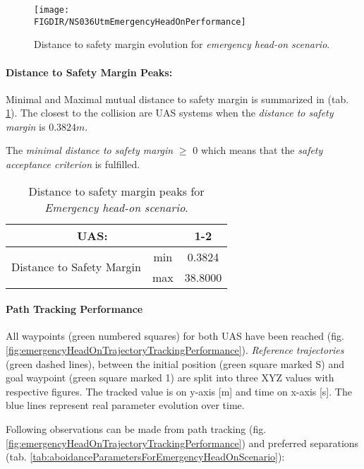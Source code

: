 \begin{figure}[H]
    \centering
    \texttt{[image: \\FIGDIR/NS036UtmEmergencyHeadOnPerformance]} 
    \caption{Distance to safety margin evolution for \emph{emergency head-on scenario}.}
    \label{fig:testCaseHeadOnAvoidancePerformance}
\end{figure}


\paragraph{Distance to Safety Margin Peaks:} Minimal and Maximal mutual distance to safety margin is summarized in (tab. \ref{tab:testCaseEmergencyHeadOnSafetyMarginDistances}). The closest to the collision are UAS systems when the \emph{distance to safety margin} is $0.3824 m$.

The \emph{minimal distance to safety margin} $\ge$ $0$ which means that the \emph{safety acceptance criterion} is fulfilled.


\begin{table}[H]
    \centering
    \begin{tabular}{c|c||c}
    \multicolumn{2}{c||}{UAS:} & 1-2 \\\hline\hline
    \multirow{2}{*}{Distance to Safety Margin} & min & 0.3824 \\\cline{2-3}
                                            & max & 38.8000 \\
    \end{tabular}
    \caption{Distance to safety margin peaks for \emph{Emergency head-on scenario}.}
    \label{tab:testCaseEmergencyHeadOnSafetyMarginDistances}
\end{table}

\paragraph{Path Tracking Performance} All waypoints (green numbered squares) for both UAS have been reached (fig. \ref{fig:emergencyHeadOnTrajectoryTrackingPerformance}). \emph{Reference trajectories} (green dashed lines), between the initial position (green square marked S) and goal waypoint (green square marked 1) are split into three XYZ values with respective figures. The tracked value is on y-axis [m] and time on x-axis [s]. The blue lines represent real parameter evolution over time.

Following observations can be made from path tracking (fig.\ref{fig:emergencyHeadOnTrajectoryTrackingPerformance}) and preferred separations (tab. \ref{tab:aboidanceParametersForEmergencyHeadOnScenario}):

